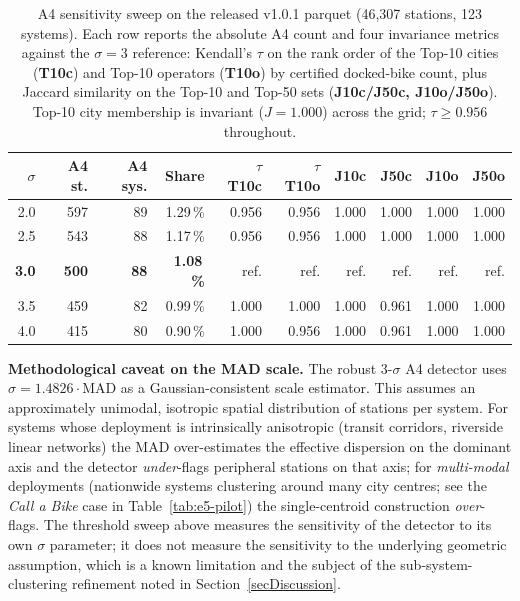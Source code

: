 \documentclass[11pt,a4paper]{article}
\begin{document}
\begin{table}[ht]
\centering
\caption{A4 sensitivity sweep on the released v1.0.1 parquet
(46{,}307 stations, 123 systems). Each row reports the absolute
A4 count and four invariance metrics against the $\sigma = 3$
reference: Kendall's $\tau$ on the rank order of the Top-10 cities
(\textbf{T10c}) and Top-10 operators (\textbf{T10o}) by certified
docked-bike count, plus Jaccard similarity on the Top-10 and
Top-50 sets (\textbf{J10c/J50c, J10o/J50o}). Top-10 city
membership is invariant ($J = 1.000$) across the grid;
$\tau \geq 0.956$ throughout.}
\label{tab:a4-sigma-sweep}
\small
\begin{tabular}{@{}rrrrrrrrrr@{}}
\toprule
\textbf{$\sigma$} & \textbf{A4 st.} & \textbf{A4 sys.} & \textbf{Share}
 & \textbf{$\tau$ T10c} & \textbf{$\tau$ T10o}
 & \textbf{J10c} & \textbf{J50c} & \textbf{J10o} & \textbf{J50o}\\
\midrule
2.0 & 597 & 89 & 1.29\,\% & 0.956 & 0.956 & 1.000 & 1.000 & 1.000 & 1.000 \\
2.5 & 543 & 88 & 1.17\,\% & 0.956 & 0.956 & 1.000 & 1.000 & 1.000 & 1.000 \\
\textbf{3.0} & \textbf{500} & \textbf{88} & \textbf{1.08\,\%} & ref. & ref. & ref. & ref. & ref. & ref. \\
3.5 & 459 & 82 & 0.99\,\% & 1.000 & 1.000 & 1.000 & 0.961 & 1.000 & 1.000 \\
4.0 & 415 & 80 & 0.90\,\% & 1.000 & 0.956 & 1.000 & 0.961 & 1.000 & 1.000 \\
\bottomrule
\end{tabular}

\medskip
{\footnotesize \textbf{Methodological caveat on the MAD scale.}
The robust 3-$\sigma$ A4 detector uses
$\hat\sigma = 1.4826 \cdot \mathrm{MAD}$ as a Gaussian-consistent
scale estimator. This assumes an approximately unimodal,
isotropic spatial distribution of stations per system. For
systems whose deployment is intrinsically anisotropic (transit
corridors, riverside linear networks) the MAD over-estimates the
effective dispersion on the dominant axis and the detector
\emph{under}-flags peripheral stations on that axis; for
\emph{multi-modal} deployments (nationwide systems clustering
around many city centres; see the \emph{Call a Bike} case in
Table~\ref{tab:e5-pilot}) the single-centroid construction
\emph{over}-flags. The threshold sweep above measures the
sensitivity of the detector to its own $\sigma$ parameter; it
does not measure the sensitivity to the underlying geometric
assumption, which is a known limitation and the subject of the
sub-system-clustering refinement noted in
Section~\ref{secDiscussion}.}
\end{table}
\end{document}
